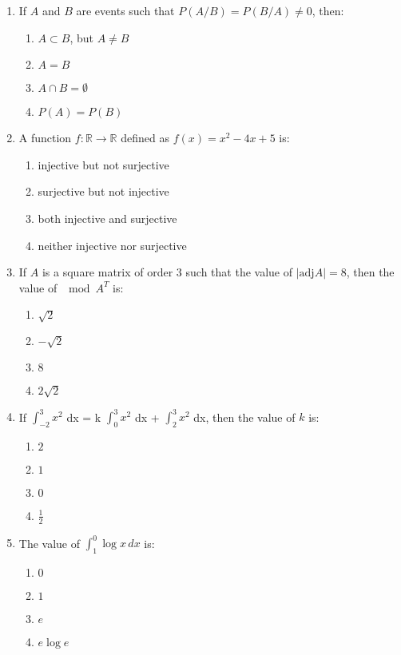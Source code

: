 \documentclass{article}
\begin{document}
\begin{enumerate}
    \item If $A$ and $B$ are events such that $P(A/B) = P(B/A) \neq 0$, then:
    \begin{enumerate}[label=(\alph*)]
        \item $A \subset B$, but $A \neq B$
        \item $A = B$
        \item $A \cap B = \emptyset$
        \item $P(A) = P(B)$
    \end{enumerate}

    \item A function $f: \mathbb{R} \to \mathbb{R}$ defined as $f(x) = x^2-4x+5$ is:
    \begin{enumerate}[label=(\alph*)]
        \item injective but not surjective
        \item surjective but not injective
        \item both injective and surjective
        \item neither injective nor surjective
    \end{enumerate}

    \item If $A$ is a square matrix of order 3 such that the value of $|\text{adj} A| = 8$, then the value of $\mod{A^T}$ is:
    \begin{enumerate}[label=(\alph*)]
        \item $\sqrt{2}$
        \item $-\sqrt{2}$
        \item ${8}$
        \item $2 \sqrt{2}$
    \end{enumerate}

    \item If  $\int_{-2}^{3} x^2$ dx = k  $\int_0^3 x^2$ dx +  $\int_2^3 x^2$ dx, then the value of $k$ is:
    \begin{enumerate}[label=(\alph*)]
        \item $2$
        \item $1$
        \item $0$
        \item $\frac{1}{2}$
    \end{enumerate}

    \item The value of $\int_{1}^{0} \log x \, dx$ is:
    \begin{enumerate}[label=(\alph*)]
        \item $0$
        \item $1$
        \item $e$
        \item $e \log e$
    \end{enumerate}


\end{enumerate}
\end{document}
